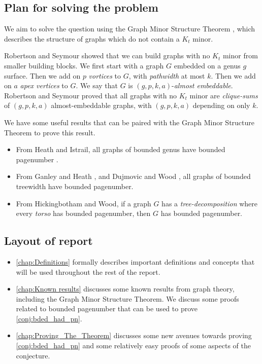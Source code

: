 \subsection{Plan for solving the problem}
We aim to solve the question using the Graph Minor Structure Theorem \cite{robertsonGraphMinorsXVI2003}, which describes the structure of graphs which do not contain a $K_t$ minor.
\par
Robertson and Seymour showed that we can build graphs with no $K_t$ minor from smaller building blocks. We first start with a graph $G$ embedded on a genus $g$ surface. Then we add on $p$ \textit{vortices} to $G$, with \textit{pathwidth} at most $k$. Then we add on $a$ \textit{apex vertices} to $G$. We say that $G$ is $(g, p, k, a)$-\textit{almost embeddable}. Robertson and Seymour \cite{robertsonGraphMinorsXVI2003} proved that all graphs with no $K_t$ minor are \textit{clique-sums} of $(g, p, k, a)$ almost-embeddable graphs, with $(g, p, k, a)$ depending on only $k$. 
\par
We have some useful results that can be paired with the Graph Minor Structure Theorem to prove this result.
\begin{itemize}
	\item From Heath and Istrail, all graphs of bounded genus have bounded pagenumber \cite{heathPagenumberGenusGraphs1992}.
	\item From Ganley and Heath \cite{ganleyPagenumberTrees2001}, and Dujmovic and Wood \cite{dujmovicGraphTreewidthGeometric2007}, all graphs of bounded treewidth have bounded pagenumber.
	\item From Hickingbotham and Wood\cite{hickingbothamStackNumberCliqueSum2023}, if a graph $G$ has a \textit{tree-decomposition} where every \textit{torso} has bounded pagenumber, then $G$ has bounded pagenumber. 
\end{itemize}

\subsection{Layout of report}
\begin{itemize}
	\item \cref{chap:Definitions} formally describes important definitions and concepts that will be used throughout the rest of the report.
	\item \cref{chap:Known results} discusses some known results from graph theory, including the Graph Minor Structure Theorem. We discuss some proofs related to bounded pagenumber that can be used to prove \cref{conj:bded_had_pn}.
	
	\item \cref{chap:Proving_The_Theorem} discusses some new avenues towards proving \cref{conj:bded_had_pn} and some relatively easy proofs of some aspects of the conjecture. 
\end{itemize}